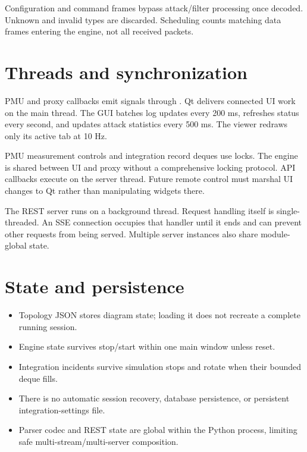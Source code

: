 Configuration and command frames bypass attack/filter processing once decoded. Unknown and invalid types are discarded. Scheduling counts matching data frames entering the engine, not all received packets.

\section*{Threads and synchronization}
PMU and proxy callbacks emit signals through . Qt delivers connected UI work on the main thread. The GUI batches log updates every 200 ms, refreshes status every second, and updates attack statistics every 500 ms. The viewer redraws only its active tab at 10 Hz.

PMU measurement controls and integration record deques use locks. The engine is shared between UI and proxy without a comprehensive locking protocol. API callbacks execute on the server thread. Future remote control must marshal UI changes to Qt rather than manipulating widgets there.

The REST server runs  on a background thread. Request handling itself is single-threaded. An SSE connection occupies that handler until it ends and can prevent other requests from being served. Multiple server instances also share module-global state.

\section*{State and persistence}
\begin{itemize}
\item Topology JSON stores diagram state; loading it does not recreate a complete running session.
\item Engine state survives stop/start within one main window unless reset.
\item Integration incidents survive simulation stops and rotate when their bounded deque fills.
\item There is no automatic session recovery, database persistence, or persistent integration-settings file.
\item Parser codec and REST state are global within the Python process, limiting safe multi-stream/multi-server composition.
\end{itemize}

